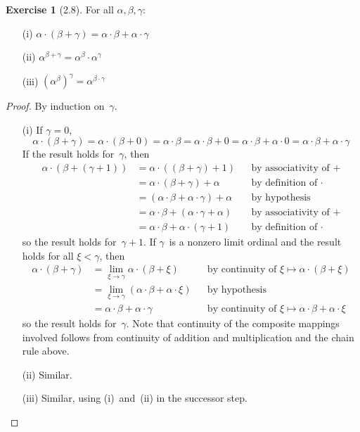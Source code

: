 \documentclass[letterpaper,12pt]{article}
\newcommand{\mult}{\cdot}
\theoremstyle{definition}
\newtheorem*{exer}{Exercise}
\theoremstyle{remark}
\begin{document}
\begin{exer}[2.8]
For all \(\alpha,\beta,\gamma\):
\begin{enumerate}[itemsep=0pt]
\item[(i)] \(\alpha\mult(\beta+\gamma)=\alpha\mult\beta+\alpha\mult\gamma\)
\item[(ii)] \(\alpha^{\beta+\gamma}=\alpha^{\beta}\mult\alpha^{\gamma}\)
\item[(iii)] \((\alpha^{\beta})^{\gamma}=\alpha^{\beta\mult\gamma}\)
\end{enumerate}
\end{exer}
\begin{proof}
By induction on~\(\gamma\).
\begin{enumerate}[itemsep=0pt]
\item[(i)] If \(\gamma=0\),
\[\alpha\mult(\beta+\gamma)=\alpha\mult(\beta+0)=\alpha\mult\beta=\alpha\mult\beta+0=\alpha\mult\beta+\alpha\mult 0=\alpha\mult\beta+\alpha\mult\gamma\]
If the result holds for~\(\gamma\), then
\begin{align*}
\alpha\mult(\beta+(\gamma+1))&=\alpha\mult((\beta+\gamma)+1)&&\text{by associativity of~\(+\)}\\
	&=\alpha\mult(\beta+\gamma)+\alpha&&\text{by definition of~\(\mult\)}\\
	&=(\alpha\mult\beta+\alpha\mult\gamma)+\alpha&&\text{by hypothesis}\\
	&=\alpha\mult\beta+(\alpha\mult\gamma+\alpha)&&\text{by associativity of~\(+\)}\\
	&=\alpha\mult\beta+\alpha\mult(\gamma+1)&&\text{by definition of~\(\mult\)}
\end{align*}
so the result holds for~\(\gamma+1\). If \(\gamma\)~is a nonzero limit ordinal and the result holds for all \(\xi<\gamma\), then
\begin{align*}
\alpha\mult(\beta+\gamma)&=\lim_{\xi\to\gamma}\alpha\mult(\beta+\xi)&&\text{by continuity of }\xi\mapsto\alpha\mult(\beta+\xi)\\
	&=\lim_{\xi\to\gamma}(\alpha\mult\beta+\alpha\mult\xi)&&\text{by hypothesis}\\
	&=\alpha\mult\beta+\alpha\mult\gamma&&\text{by continuity of }\xi\mapsto\alpha\mult\beta+\alpha\mult\xi
\end{align*}
so the result holds for~\(\gamma\). Note that continuity of the composite mappings involved follows from continuity of addition and multiplication and the chain rule above.
\item[(ii)] Similar.
\item[(iii)] Similar, using (i)~and~(ii) in the successor step.\qedhere
\end{enumerate}
\end{proof}
\end{document}
